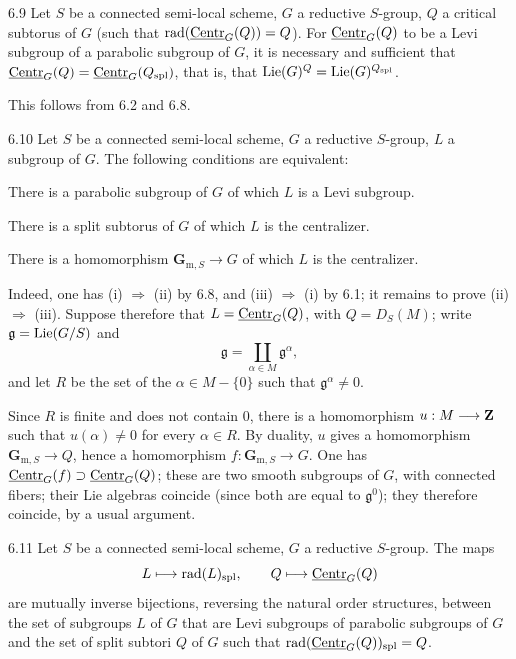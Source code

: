 \begin{corollary}{6.9}\label{XXVI.6.9}
Let $S$ be a connected semi-local scheme, $G$ a reductive $S$-group, $Q$ a critical subtorus of $G$ (\ie such that $\operatorname{rad}(\underline{\mathrm{Centr}}_G(Q))=Q$). For $\underline{\mathrm{Centr}}_G(Q)$ to be a Levi subgroup of a parabolic subgroup of $G$, it is necessary and sufficient that $\underline{\mathrm{Centr}}_G(Q)=\underline{\mathrm{Centr}}_G(Q_{\mathrm{spl}})$, that is, that $\operatorname{Lie}(G)^Q=\operatorname{Lie}(G)^{Q_{\mathrm{spl}}}$.
\end{corollary}
This follows from 6.2 and 6.8.

\begin{corollary}{6.10}\label{XXVI.6.10}
Let $S$ be a connected semi-local scheme, $G$ a reductive $S$-group, $L$ a subgroup of $G$. The following conditions are equivalent:
\begin{enumeratei}
\item There is a parabolic subgroup of $G$ of which $L$ is a Levi subgroup.
\item There is a split subtorus of $G$ of which $L$ is the centralizer.
\item There is a homomorphism $\mathbf{G}_{\mathrm m,S}\to G$ of which $L$ is the centralizer.
\end{enumeratei}
\end{corollary}
Indeed, one has (i) $\Rightarrow$ (ii) by 6.8, and (iii) $\Rightarrow$ (i) by 6.1; it remains to prove (ii) $\Rightarrow$ (iii). Suppose therefore that $L=\underline{\mathrm{Centr}}_G(Q)$, with $Q=D_S(M)$; write $\mathfrak g=\operatorname{Lie}(G/S)$ and
\[
 \mathfrak g=\coprod_{\alpha\in M}\mathfrak g^\alpha,
\]
and let $R$ be the set of the $\alpha\in M-\{0\}$ such that $\mathfrak g^\alpha\neq0$.

Since $R$ is finite and does not contain 0, there is a homomorphism $u:M\longrightarrow\mathbf{Z}$ such that $u(\alpha)\neq0$ for every $\alpha\in R$. By duality, $u$ gives a homomorphism $\mathbf{G}_{\mathrm m,S}\to Q$, hence a homomorphism $f:\mathbf{G}_{\mathrm m,S}\to G$. One has $\underline{\mathrm{Centr}}_G(f)\supset\underline{\mathrm{Centr}}_G(Q)$; these are two smooth subgroups of $G$, with connected fibers; their Lie algebras coincide (since both are equal to $\mathfrak g^0$); they therefore coincide, by a usual argument.

\begin{corollary}{6.11}\label{XXVI.6.11}
Let $S$ be a connected semi-local scheme, $G$ a reductive $S$-group. The maps
\[
 L\longmapsto\operatorname{rad}(L)_{\mathrm{spl}},\qquad Q\longmapsto\underline{\mathrm{Centr}}_G(Q)
\]
are mutually inverse bijections, reversing the natural order structures, between the set of subgroups $L$ of $G$ that are Levi subgroups of parabolic subgroups of $G$ and the set of split subtori $Q$ of $G$ such that $\operatorname{rad}(\underline{\mathrm{Centr}}_G(Q))_{\mathrm{spl}}=Q$.
\end{corollary}

